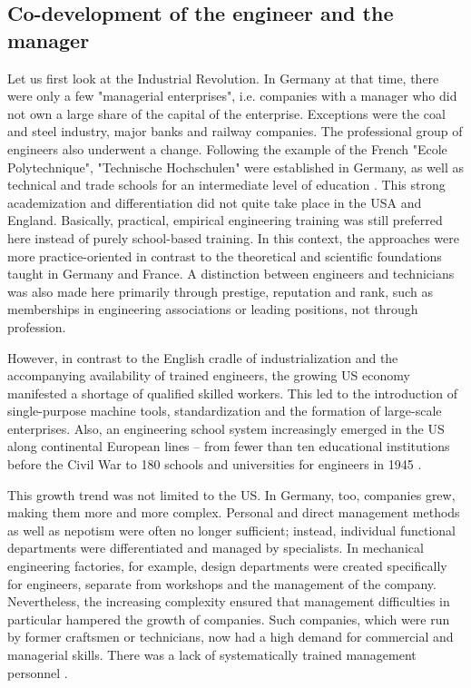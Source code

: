 \documentclass[a4paper,12pt]{article}
\begin{document}
\subsection{Co-development of the engineer and the manager}
Let us first look at the Industrial Revolution. In Germany at that time, there
were only a few "managerial enterprises", i.e. companies with a manager who
did not own a large share of the capital of the enterprise. Exceptions were
the coal and steel industry, major banks and railway companies. The
professional group of engineers also underwent a change. Following the example
of the French "Ecole Polytechnique", "Technische Hochschulen" were established
in Germany, as well as technical and trade schools for an intermediate level
of education \cite{kaiser:2006}. This strong academization and differentiation
did not quite take place in the USA and England. Basically, practical,
empirical engineering training was still preferred here instead of purely
school-based training. In this context, the approaches were more
practice-oriented in contrast to the theoretical and scientific foundations
taught in Germany and France. A distinction between engineers and technicians
was also made here primarily through prestige, reputation and rank, such as
memberships in engineering associations or leading positions, not through
profession.

However, in contrast to the English cradle of industrialization and the
accompanying availability of trained engineers, the growing US economy
manifested a shortage of qualified skilled workers. This led to the
introduction of single-purpose machine tools, standardization and the
formation of large-scale enterprises. Also, an engineering school system
increasingly emerged in the US along continental European lines -- from fewer
than ten educational institutions before the Civil War to 180 schools and
universities for engineers in 1945 \cite{gispen:2006}.

This growth trend was not limited to the US. In Germany, too, companies grew,
making them more and more complex. Personal and direct management methods as
well as nepotism were often no longer sufficient; instead, individual
functional departments were differentiated and managed by specialists. In
mechanical engineering factories, for example, design departments were created
specifically for engineers, separate from workshops and the management of the
company. Nevertheless, the increasing complexity ensured that management
difficulties in particular hampered the growth of companies. Such companies,
which were run by former craftsmen or technicians, now had a high demand for
commercial and managerial skills. There was a lack of systematically trained
management personnel \cite{kocka:1999}.
\end{document}
